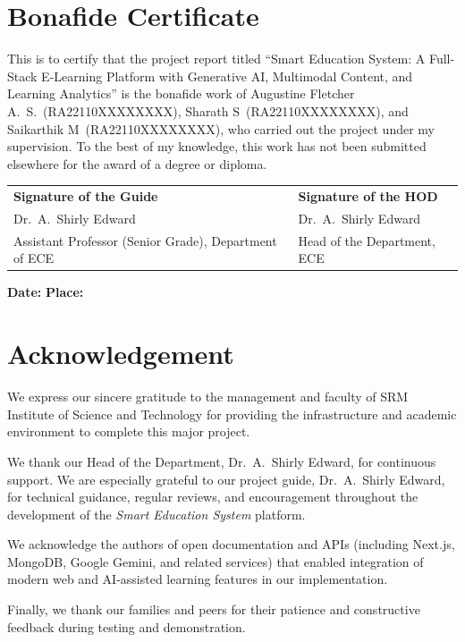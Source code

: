 \documentclass[a4paper,12pt,openany]{report}
\newcommand{\ProjectTitle}{Smart Education System: A Full-Stack E-Learning Platform with Generative AI, Multimodal Content, and Learning Analytics}
\newcommand{\StudentOneName}{Augustine Fletcher A.\ S.}
\newcommand{\StudentOneReg}{RA22110XXXXXXXX}
\newcommand{\StudentTwoName}{Sharath S}
\newcommand{\StudentTwoReg}{RA22110XXXXXXXX}
\newcommand{\StudentThreeName}{Saikarthik M}
\newcommand{\StudentThreeReg}{RA22110XXXXXXXX}
\newcommand{\GuideName}{Dr.\ A.\ Shirly Edward}
\newcommand{\GuideDesignation}{Assistant Professor (Senior Grade), Department of ECE}
\newcommand{\HODName}{Dr.\ A.\ Shirly Edward}
\begin{document}
\chapter*{Bonafide Certificate}
This is to certify that the project report titled ``\ProjectTitle'' is the bonafide work of \StudentOneName\ (\StudentOneReg), \StudentTwoName\ (\StudentTwoReg), and \StudentThreeName\ (\StudentThreeReg), who carried out the project under my supervision. To the best of my knowledge, this work has not been submitted elsewhere for the award of a degree or diploma.

\vspace{2cm}
\noindent\begin{tabular}{p{7cm}p{7cm}}
\textbf{Signature of the Guide} & \textbf{Signature of the HOD} \\[2.5cm]
\GuideName & \HODName \\
\GuideDesignation & Head of the Department, ECE \\
\end{tabular}

\vspace{1.5cm}
\noindent\textbf{Date:}\underline{\hspace{4cm}}\hfill
\textbf{Place:}\underline{\hspace{4cm}}

\clearpage

\chapter*{Acknowledgement}
We express our sincere gratitude to the management and faculty of SRM Institute of Science and Technology for providing the infrastructure and academic environment to complete this major project.

We thank our Head of the Department, \HODName, for continuous support. We are especially grateful to our project guide, \GuideName, for technical guidance, regular reviews, and encouragement throughout the development of the \textit{Smart Education System} platform.

We acknowledge the authors of open documentation and APIs (including Next.js, MongoDB, Google Gemini, and related services) that enabled integration of modern web and AI-assisted learning features in our implementation.

Finally, we thank our families and peers for their patience and constructive feedback during testing and demonstration.
\end{document}
